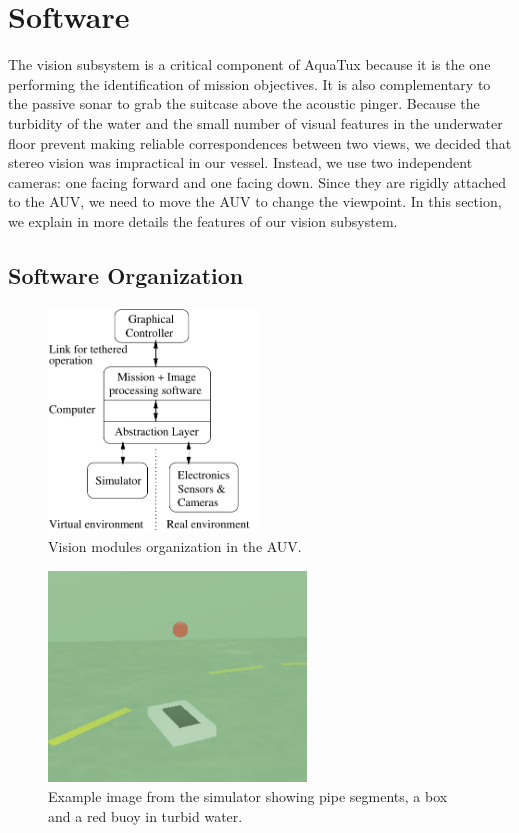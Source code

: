 \section{Software}

The vision subsystem is a critical component of AquaTux because it is
the one performing the identification of mission objectives. It is
also complementary to the passive sonar to grab the suitcase above the
acoustic pinger. Because the turbidity of the water and the small
number of visual features in the underwater floor prevent making
reliable correspondences between two views, we decided that stereo
vision was impractical in our vessel. Instead, we use two independent
cameras: one facing forward and one facing down. Since they
are rigidly attached to the AUV, we need to move the AUV
to change the viewpoint. In this section, we explain in more details
the features of our vision subsystem.

\subsection{Software Organization}
\label{gui}


\begin{figure}
\begin{center}
 \includegraphics[width=2.2in]{fig/vision}
\caption{Vision modules organization in the AUV.}\label{vision}
\end{center}
\end{figure}


\begin{figure}
\begin{center}
 \includegraphics[width=2.7in]{fig/sim}
\caption{Example image from the simulator showing pipe segments, a box
  and a red buoy in turbid water.}\label{sim}
\end{center}
\end{figure}


